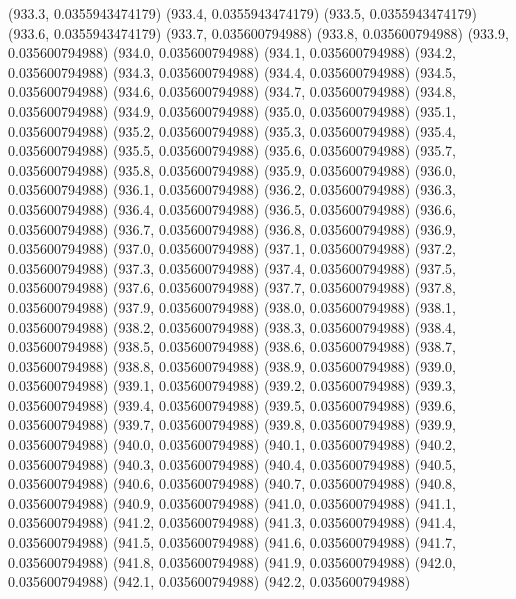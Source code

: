 {					(933.3, 0.0355943474179)
					(933.4, 0.0355943474179)
					(933.5, 0.0355943474179)
					(933.6, 0.0355943474179)
					(933.7, 0.035600794988)
					(933.8, 0.035600794988)
					(933.9, 0.035600794988)
					(934.0, 0.035600794988)
					(934.1, 0.035600794988)
					(934.2, 0.035600794988)
					(934.3, 0.035600794988)
					(934.4, 0.035600794988)
					(934.5, 0.035600794988)
					(934.6, 0.035600794988)
					(934.7, 0.035600794988)
					(934.8, 0.035600794988)
					(934.9, 0.035600794988)
					(935.0, 0.035600794988)
					(935.1, 0.035600794988)
					(935.2, 0.035600794988)
					(935.3, 0.035600794988)
					(935.4, 0.035600794988)
					(935.5, 0.035600794988)
					(935.6, 0.035600794988)
					(935.7, 0.035600794988)
					(935.8, 0.035600794988)
					(935.9, 0.035600794988)
					(936.0, 0.035600794988)
					(936.1, 0.035600794988)
					(936.2, 0.035600794988)
					(936.3, 0.035600794988)
					(936.4, 0.035600794988)
					(936.5, 0.035600794988)
					(936.6, 0.035600794988)
					(936.7, 0.035600794988)
					(936.8, 0.035600794988)
					(936.9, 0.035600794988)
					(937.0, 0.035600794988)
					(937.1, 0.035600794988)
					(937.2, 0.035600794988)
					(937.3, 0.035600794988)
					(937.4, 0.035600794988)
					(937.5, 0.035600794988)
					(937.6, 0.035600794988)
					(937.7, 0.035600794988)
					(937.8, 0.035600794988)
					(937.9, 0.035600794988)
					(938.0, 0.035600794988)
					(938.1, 0.035600794988)
					(938.2, 0.035600794988)
					(938.3, 0.035600794988)
					(938.4, 0.035600794988)
					(938.5, 0.035600794988)
					(938.6, 0.035600794988)
					(938.7, 0.035600794988)
					(938.8, 0.035600794988)
					(938.9, 0.035600794988)
					(939.0, 0.035600794988)
					(939.1, 0.035600794988)
					(939.2, 0.035600794988)
					(939.3, 0.035600794988)
					(939.4, 0.035600794988)
					(939.5, 0.035600794988)
					(939.6, 0.035600794988)
					(939.7, 0.035600794988)
					(939.8, 0.035600794988)
					(939.9, 0.035600794988)
					(940.0, 0.035600794988)
					(940.1, 0.035600794988)
					(940.2, 0.035600794988)
					(940.3, 0.035600794988)
					(940.4, 0.035600794988)
					(940.5, 0.035600794988)
					(940.6, 0.035600794988)
					(940.7, 0.035600794988)
					(940.8, 0.035600794988)
					(940.9, 0.035600794988)
					(941.0, 0.035600794988)
					(941.1, 0.035600794988)
					(941.2, 0.035600794988)
					(941.3, 0.035600794988)
					(941.4, 0.035600794988)
					(941.5, 0.035600794988)
					(941.6, 0.035600794988)
					(941.7, 0.035600794988)
					(941.8, 0.035600794988)
					(941.9, 0.035600794988)
					(942.0, 0.035600794988)
					(942.1, 0.035600794988)
					(942.2, 0.035600794988)
}
